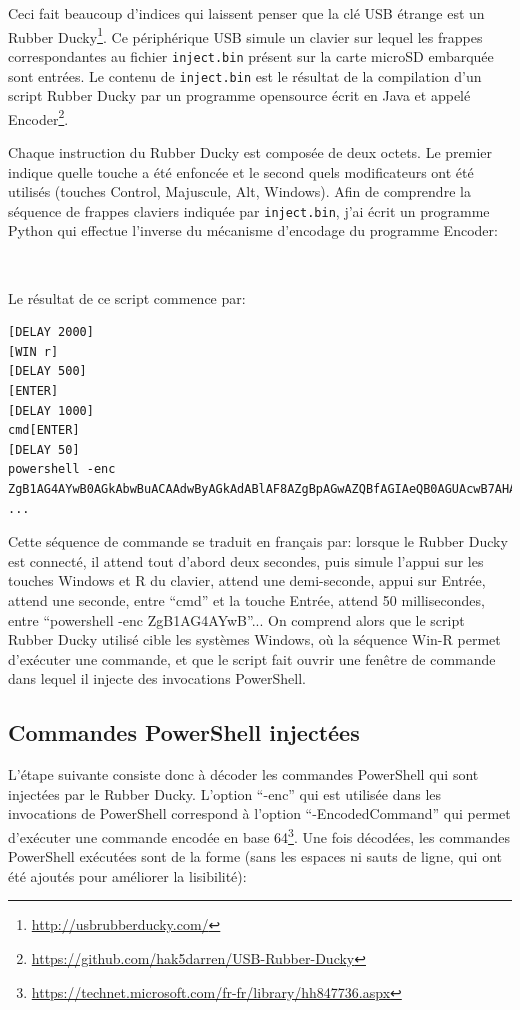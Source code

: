 \documentclass[a4paper,10pt]{article}
\newcommand{\pyinput}[1]{%
    \noindent{\color[rgb]{0.5, 0.5, 0.5}{\rule{\textwidth}{0.4pt}}}
     \\
    \noindent{\color[rgb]{0.5, 0.5, 0.5}{\rule{\textwidth}{0.4pt}}}
}
\begin{document}
Ceci fait beaucoup d'indices qui laissent penser que la clé USB étrange est un Rubber Ducky\footnote{\url{http://usbrubberducky.com/}}.
Ce périphérique USB simule un clavier sur lequel les frappes correspondantes au fichier \texttt{inject.bin} présent sur la carte microSD embarquée sont entrées.
Le contenu de \texttt{inject.bin} est le résultat de la compilation d'un script Rubber Ducky par un programme opensource écrit en Java et appelé Encoder\footnote{\url{https://github.com/hak5darren/USB-Rubber-Ducky}}.

Chaque instruction du Rubber Ducky est composée de deux octets.
Le premier indique quelle touche a été enfoncée et le second quels modificateurs ont été utilisés (touches Control, Majuscule, Alt, Windows).
Afin de comprendre la séquence de frappes claviers indiquée par \texttt{inject.bin}, j'ai écrit un programme Python qui effectue l'inverse du mécanisme d'encodage du programme Encoder:

\clearpage
\pyinput{stage1/rubberdecode.py.inc.tex}

Le résultat de ce script commence par:
\begin{verbatim}
[DELAY 2000]
[WIN r]
[DELAY 500]
[ENTER]
[DELAY 1000]
cmd[ENTER]
[DELAY 50]
powershell -enc ZgB1AG4AYwB0AGkAbwBuACAAdwByAGkAdABlAF8AZgBpAGwAZQBfAGIAeQB0AGUAcwB7AHAAY
...
\end{verbatim}

Cette séquence de commande se traduit en français par: lorsque le Rubber Ducky est connecté, il attend tout d'abord deux secondes, puis simule l'appui sur les touches Windows et R du clavier, attend une demi-seconde, appui sur Entrée, attend une seconde, entre ``cmd'' et la touche Entrée, attend 50 millisecondes, entre ``powershell -enc ZgB1AG4AYwB''...
On comprend alors que le script Rubber Ducky utilisé cible les systèmes Windows, où la séquence Win-R permet d'exécuter une commande, et que le script fait ouvrir une fenêtre de commande dans lequel il injecte des invocations PowerShell.

\subsection{Commandes PowerShell injectées}

L'étape suivante consiste donc à décoder les commandes PowerShell qui sont injectées par le Rubber Ducky.
L'option ``-enc'' qui est utilisée dans les invocations de PowerShell correspond à l'option ``-EncodedCommand'' qui permet d'exécuter une commande encodée en base 64\footnote{\url{https://technet.microsoft.com/fr-fr/library/hh847736.aspx}}.
Une fois décodées, les commandes PowerShell exécutées sont de la forme (sans les espaces ni sauts de ligne, qui ont été ajoutés pour améliorer la lisibilité):
\end{document}
